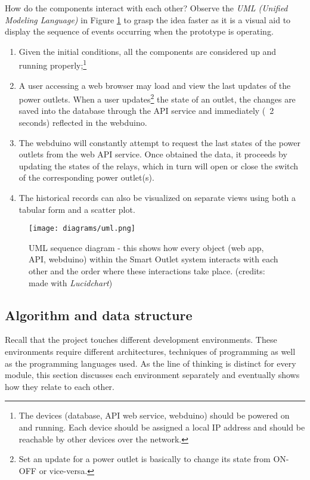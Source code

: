 \noindent
How do the components interact with each other? Observe the \emph{UML (Unified Modeling Language)} in Figure \ref{fig:uml-diagram} to grasp the idea faster as it is a visual aid to display the sequence of events occurring when the prototype is operating.
\begin{enumerate}
    \item Given the initial conditions, all the components are considered up and running properly;\footnote{The devices (database, API web service, webduino) should be powered on and running. Each device should be assigned a local IP address and should be reachable by other devices over the network.}
    \item A user accessing a web browser may load and view the last updates of the power outlets. When a user updates\footnote{Set an update for a power outlet is basically to change its state from ON-OFF or vice-versa.} the state of an outlet, the changes are saved into the database through the API service and immediately (~2 seconds) reflected in the webduino.
    \item The webduino will constantly attempt to request the last states of the power outlets from the web API service. Once obtained the data, it proceeds by updating the states of the relays, which in turn will open or close the switch of the corresponding power outlet(s).
    \item The historical records can also be visualized on separate views using both a tabular form and a scatter plot.
\end{enumerate}

\begin{figure}[ht!]
    \centering
    \texttt{[image: diagrams/uml.png]}
    \caption{UML sequence diagram - this shows how every object (web app, API, webduino) within the Smart Outlet system interacts with each other and the order where these interactions take place. (credits: made with \emph{Lucidchart})}
    \label{fig:uml-diagram}
\end{figure}

\subsection{Algorithm and data structure}
Recall that the project touches different development environments. These
environments require different architectures, techniques of programming as well
as the programming languages used. As the line of thinking is distinct for every module, this section discusses each environment separately and eventually shows how
they relate to each other.

